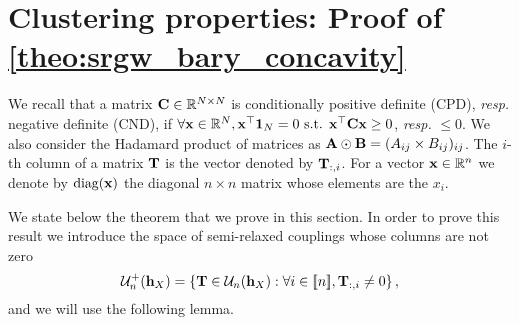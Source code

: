 
\section{Clustering properties: Proof of \cref{theo:srgw_bary_concavity} \label{sec:srGW_concavity_supp}}
We recall that a matrix ${\mathbf{C}} \in \mathbb{R}^{N \times N}$ is conditionally positive definite (CPD), \textit{resp.} negative definite (CND), if $\forall {\mathbf{x}} \in \mathbb{R}^{N}, {\mathbf{x}}^\top \mathbf{1}_N = 0 \text{ s.t. } {\mathbf{x}}^\top {\mathbf{C}} {\mathbf{x}} \geq 0$, \textit{resp.} $\leq 0$. We also consider the Hadamard product of matrices as ${\mathbf{A}} \odot {\mathbf{B}} = (A_{ij} \times B_{ij})_{ij}$. The $i$-th column of a matrix ${\mathbf{T}}$ is the vector denoted by ${\mathbf{T}}_{:,i}$. For a vector ${\mathbf{x}}\in \mathbb{R}^{n}$ we denote by $\operatorname{diag}({\mathbf{x}})$ the diagonal $n \times n$ matrix whose elements are the $x_i$. 

We state below the theorem that we prove in this section.
\baryconcavity*
In order to prove this result we introduce the space of semi-relaxed couplings whose columns are not zero
\begin{equation}
	\label{eq:guplus}
	{\mathcal{U}}_{n}^{+}({\mathbf{h}}_X) = \{{\mathbf{T}} \in {\mathcal{U}}_{n}({\mathbf{h}}_X) : \forall i \in {[\![n]\!]}, {\mathbf{T}}_{:,i} \neq 0\}\,,
\end{equation}
and we will use the following lemma.





